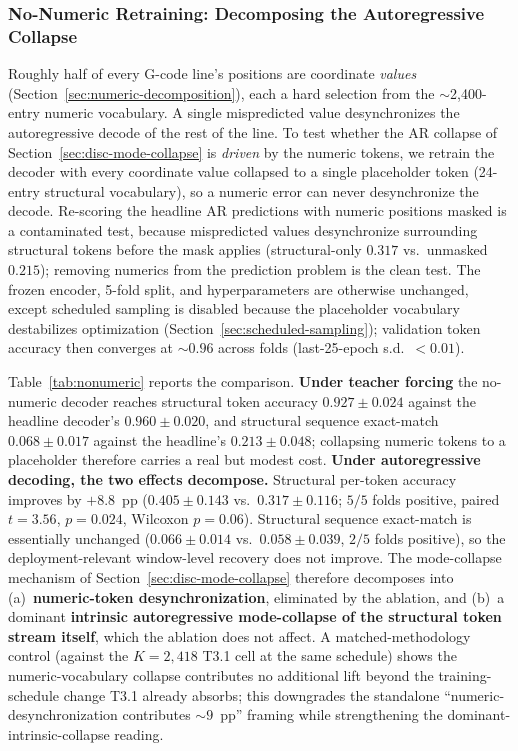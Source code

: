\documentclass[sensors,article,submit,moreauthors,pdftex]{Definitions/mdpi}
\begin{document}
\subsubsection{No-Numeric Retraining: Decomposing the Autoregressive Collapse}
\label{sec:abl-nonumeric}

Roughly half of every G-code line's positions are coordinate \emph{values} (Section~\ref{sec:numeric-decomposition}), each a hard selection from the $\sim$2{,}400-entry numeric vocabulary. A single mispredicted value desynchronizes the autoregressive decode of the rest of the line. To test whether the AR collapse of Section~\ref{sec:disc-mode-collapse} is \emph{driven} by the numeric tokens, we retrain the decoder with every coordinate value collapsed to a single placeholder token (24-entry structural vocabulary), so a numeric error can never desynchronize the decode. Re-scoring the headline AR predictions with numeric positions masked is a contaminated test, because mispredicted values desynchronize surrounding structural tokens before the mask applies (structural-only $0.317$ vs.\ unmasked $0.215$); removing numerics from the prediction problem is the clean test. The frozen encoder, 5-fold split, and hyperparameters are otherwise unchanged, except scheduled sampling is disabled because the placeholder vocabulary destabilizes optimization (Section~\ref{sec:scheduled-sampling}); validation token accuracy then converges at $\sim$$0.96$ across folds (last-25-epoch s.d.\ $<\!0.01$).

Table~\ref{tab:nonumeric} reports the comparison. \textbf{Under teacher forcing} the no-numeric decoder reaches structural token accuracy $0.927 \pm 0.024$ against the headline decoder's $0.960 \pm 0.020$, and structural sequence exact-match $0.068 \pm 0.017$ against the headline's $0.213 \pm 0.048$; collapsing numeric tokens to a placeholder therefore carries a real but modest cost. \textbf{Under autoregressive decoding, the two effects decompose.} Structural per-token accuracy improves by $+8.8$~pp ($0.405 \pm 0.143$ vs.\ $0.317 \pm 0.116$; $5/5$ folds positive, paired $t=3.56$, $p=0.024$, Wilcoxon $p=0.06$). Structural sequence exact-match is essentially unchanged ($0.066 \pm 0.014$ vs.\ $0.058 \pm 0.039$, $2/5$ folds positive), so the deployment-relevant window-level recovery does not improve. The mode-collapse mechanism of Section~\ref{sec:disc-mode-collapse} therefore decomposes into (a)~\textbf{numeric-token desynchronization}, eliminated by the ablation, and (b)~a dominant \textbf{intrinsic autoregressive mode-collapse of the structural token stream itself}, which the ablation does not affect. A matched-methodology control (against the $K\!=\!2{,}418$ T3.1 cell at the same schedule) shows the numeric-vocabulary collapse contributes no additional lift beyond the training-schedule change T3.1 already absorbs; this downgrades the standalone ``numeric-desynchronization contributes $\sim\!9$~pp'' framing while strengthening the dominant-intrinsic-collapse reading.
\end{document}
